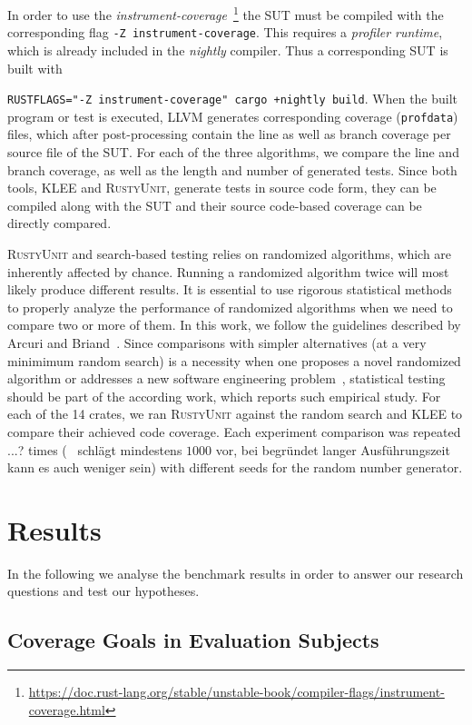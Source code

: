 \documentclass[paper=a4,%
  twoside,%
  BCOR4mm,%
  abstract=true,%
  toc=bibliography,%
  chapterprefix=true,%
  toc=bibliographynumbered,%
  open=right,%
  english,%
  pagesize=pdftex]{scrreprt}
\begin{document}
In order to use the \textit{instrument-coverage}~\footnote{\url{https://doc.rust-lang.org/stable/unstable-book/compiler-flags/instrument-coverage.html}} the SUT must be compiled with the corresponding flag \lstinline{-Z instrument-coverage}. This requires a \textit{profiler runtime}, which is already included in the \textit{nightly} compiler. Thus a corresponding SUT is built with \raggedright\lstinline{RUSTFLAGS="-Z instrument-coverage" cargo +nightly build}. When the built program or test is executed, LLVM generates corresponding coverage (\lstinline{profdata}) files, which after post-processing contain the line as well as branch coverage per source file of the \ac{SUT}. For each of the three algorithms, we compare the line and branch coverage, as well as the length and number of generated tests. Since both tools, \textsc{KLEE} and \textsc{RustyUnit}, generate tests in source code form, they can be compiled along with the \ac{SUT} and their source code-based coverage can be directly compared.

\textsc{RustyUnit} and search-based testing relies on randomized algorithms, which are inherently affected by chance. Running a randomized algorithm twice will most likely produce different results. It is essential to use rigorous statistical methods to properly analyze the performance of randomized algorithms when we need to compare two or more of them. In this work, we follow the guidelines described by Arcuri and Briand~\cite{Arcuri2011}. Since comparisons with simpler alternatives (at a very minimimum random search) is a necessity when one proposes a novel randomized algorithm or addresses a new software engineering problem~\cite{Ali2010}, statistical testing should be part of the according work, which reports such empirical study. For each of the 14 crates, we ran \textsc{RustyUnit} against the random search and \textsc{KLEE} to compare their achieved code coverage. Each experiment comparison was repeated ...? times (~\cite{Arcuri2011} schlägt mindestens $1000$ vor, bei begründet langer Ausführungszeit kann es auch weniger sein) with different seeds for the random number generator.

\section{Results}
\label{sec:results}
In the following we analyse the benchmark results in order to answer our research questions and test our hypotheses. 

\subsection{Coverage Goals in Evaluation Subjects}
\end{document}
